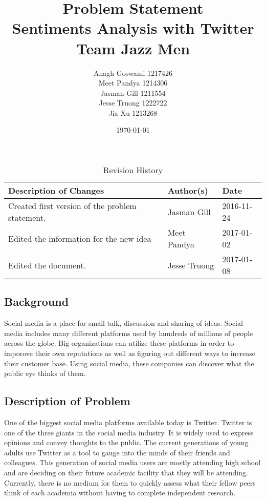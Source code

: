 \documentclass[12pt]{article}
\begin{document}
\title{Problem Statement\\  Sentiments Analysis with Twitter \\Team Jazz Men}
\author{Anagh Goswami 1217426 \\ Meet Pandya 1214306 \\ Jasman Gill  1211554 \\ Jesse Truong  1222722 \\ Jia Xu  1213268 \\}
\date{\today}
\maketitle
{}
\maketitle
\newpage

\begin{table}[h]
\centering
\caption{Revision History}
\begin{tabular}{p{9cm}ll}
\toprule
\textbf{Description of Changes} & \textbf{Author(s)} & \textbf{Date}\\\midrule
Created first version of the  problem statement. & Jasman Gill & 2016-11-24\\\midrule
Edited the information for the new idea & Meet Pandya & 2017-01-02\\\midrule
Edited the document. &Jesse Truong &2017-01-08\\\bottomrule
\end{tabular}
\end{table}

\subsection*{Background}
Social media is a place for small talk, discussion and sharing of ideas. Social media includes many different platforms used by hundreds of millions of people across the globe. Big organizations can utilize these platforms in order to imporove their own reputations as well as figuring out different ways to increase their customer base. Using social media, these companies can discover what the public eye thinks of them.\\

\subsection*{Description of Problem}
One of the biggest social media platforms available today is Twitter. Twitter is one of the three giants in the social media industry. It is widely used to express opinions and convey thoughts to the public. The current generations of young adults use Twitter as a tool to gauge into the minds of their friends and colleagues. This generation of social media users are mostly attending high school and are deciding on their future academic facility that they will be attending. Currently, there is no medium for them to quickly assess what their fellow peers think of each academia without having to complete independent research.\\
\end{document}
